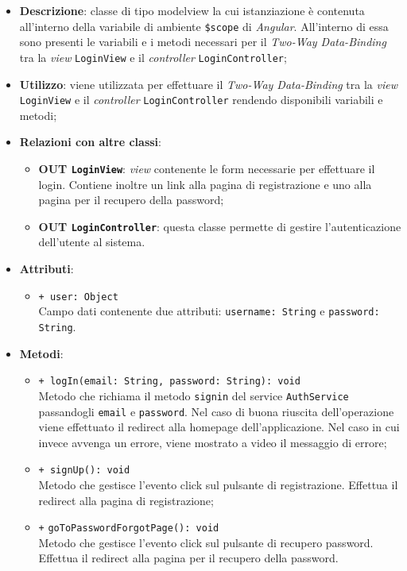 	\begin{itemize}
		\item \textbf{Descrizione}: classe di tipo modelview la cui istanziazione è contenuta all'interno della variabile di ambiente \texttt{\$scope} di \textit{Angular}. All'interno di essa sono presenti le variabili e i metodi necessari per il \textit{Two-Way Data-Binding} tra la \textit{view} \texttt{LoginView} e il \textit{controller} \texttt{LoginController};
		\item \textbf{Utilizzo}: viene utilizzata per effettuare il \textit{Two-Way Data-Binding} tra la \textit{view} \texttt{LoginView} e il \textit{controller} \texttt{LoginController} rendendo disponibili variabili e metodi;
		\item \textbf{Relazioni con altre classi}: 
		\begin{itemize}
			\item \textbf{OUT \texttt{LoginView}}: \textit{view} contenente le form necessarie per effettuare il login. Contiene inoltre un link alla pagina di registrazione e uno alla pagina per il recupero della password; 
			\item \textbf{OUT \texttt{LoginController}}: questa classe permette di gestire l'autenticazione dell'utente al sistema.
		\end{itemize}
		\item \textbf{Attributi}: 
		\begin{itemize}
				\item \texttt{+ user: Object} \\ Campo dati contenente due attributi: \texttt{username: String} e \texttt{password: String}.
		\end{itemize}
		\item \textbf{Metodi}: 
		\begin{itemize}
			\item \texttt{+ logIn(email: String, password: String): void} \\
			Metodo che richiama il metodo \texttt{signin} del service \texttt{AuthService} passandogli \texttt{email} e \texttt{password}. Nel caso di buona riuscita dell'operazione viene effettuato il redirect alla homepage dell'applicazione. Nel caso in cui invece avvenga un errore, viene mostrato a video il messaggio di errore;
			\item \texttt{+ signUp(): void} \\
			Metodo che gestisce l’evento click sul pulsante di registrazione. Effettua il redirect alla pagina di registrazione;
			\item \texttt{+} \texttt{goToPasswordForgotPage(): void} \\
			Metodo che gestisce l'evento click sul pulsante di recupero password. Effettua il redirect alla pagina per il recupero della password.
		\end{itemize}
	\end{itemize}
	
	